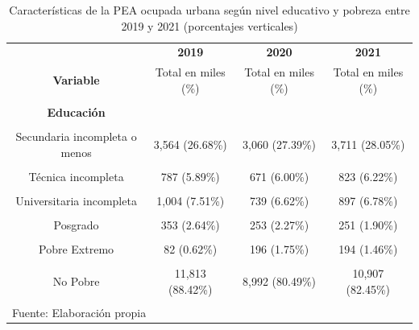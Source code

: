 \documentclass[
  letterpaper,
  12pt,
  oneside,
  spanish,
  doublespacing,
  headsepline,
  parskip]{MastersDoctoralThesis}
\begin{document}
\hypertarget{tbl-edpobre}{}
\begin{table}[H]
\caption{\label{tbl-edpobre}Características de la PEA ocupada urbana según nivel educativo y pobreza
entre 2019 y 2021 (porcentajes verticales) }\tabularnewline

\centering\begingroup\fontsize{10}{12}\selectfont

\begin{tabular}{cccc}
\toprule
\multicolumn{1}{c}{ } & \multicolumn{1}{c}{\textbf{2019}} & \multicolumn{1}{c}{\textbf{2020}} & \multicolumn{1}{c}{\textbf{2021}} \\
\cmidrule(l{3pt}r{3pt}){2-2} \cmidrule(l{3pt}r{3pt}){3-3} \cmidrule(l{3pt}r{3pt}){4-4}
\textbf{Variable} & Total en miles (\%) & Total en miles (\%) & Total en miles (\%)\\
\midrule
\cellcolor{gray!6}{\textbf{Nacional}} & \cellcolor{gray!6}{13,360 (100.00\%)} & \cellcolor{gray!6}{11,172 (100.00\%)} & \cellcolor{gray!6}{13,229 (100.00\%)}\\
\textbf{Educación} &  &  & \\
\cellcolor{gray!6}{Sin nivel} & \cellcolor{gray!6}{225 (1.68\%)} & \cellcolor{gray!6}{171 (1.54\%)} & \cellcolor{gray!6}{205 (1.55\%)}\\
Secundaria incompleta o menos & 3,564 (26.68\%) & 3,060 (27.39\%) & 3,711 (28.05\%)\\
\cellcolor{gray!6}{Secundaria completa} & \cellcolor{gray!6}{4,177 (31.27\%)} & \cellcolor{gray!6}{3,622 (32.43\%)} & \cellcolor{gray!6}{4,434 (33.51\%)}\\
\addlinespace
Técnica incompleta & 787 (5.89\%) & 671 (6.00\%) & 823 (6.22\%)\\
\cellcolor{gray!6}{Técnica completa} & \cellcolor{gray!6}{1,687 (12.63\%)} & \cellcolor{gray!6}{1,376 (12.32\%)} & \cellcolor{gray!6}{1,542 (11.66\%)}\\
Universitaria incompleta & 1,004 (7.51\%) & 739 (6.62\%) & 897 (6.78\%)\\
\cellcolor{gray!6}{Universitaria completa} & \cellcolor{gray!6}{1,563 (11.70\%)} & \cellcolor{gray!6}{1,279 (11.45\%)} & \cellcolor{gray!6}{1,366 (10.32\%)}\\
Posgrado & 353 (2.64\%) & 253 (2.27\%) & 251 (1.90\%)\\
\addlinespace
\cellcolor{gray!6}{\textbf{Pobreza}} & \cellcolor{gray!6}{} & \cellcolor{gray!6}{} & \cellcolor{gray!6}{}\\
Pobre Extremo & 82 (0.62\%) & 196 (1.75\%) & 194 (1.46\%)\\
\cellcolor{gray!6}{Pobre No Extremo} & \cellcolor{gray!6}{1,465 (10.97\%)} & \cellcolor{gray!6}{1,984 (17.76\%)} & \cellcolor{gray!6}{2,128 (16.09\%)}\\
No Pobre & 11,813 (88.42\%) & 8,992 (80.49\%) & 10,907 (82.45\%)\\
\bottomrule
\multicolumn{4}{l}{\textsuperscript{} Fuente: Elaboración propia}\\
\end{tabular}
\endgroup{}
\end{table}
\end{document}
